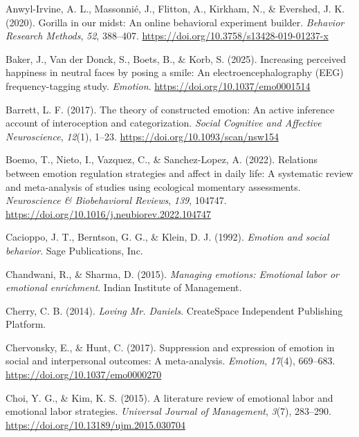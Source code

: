 \documentclass[
  letterpaper,
  DIV=11,
  numbers=noendperiod]{scrartcl}
\newlength{\cslhangindent}
\newenvironment{CSLReferences}[2] %
 {\begin{list}{}{%
  \setlength{\itemindent}{0pt}
  \setlength{\leftmargin}{0pt}
  \setlength{\parsep}{0pt}
  \ifodd #1
   \setlength{\leftmargin}{\cslhangindent}
   \setlength{\itemindent}{-1\cslhangindent}
  \fi
  \setlength{\itemsep}{#2\baselineskip}}}
 {\end{list}}
\begin{document}
\protect{}\label{refs}
\begin{CSLReferences}{1}{0}
Anwyl-Irvine, A. L., Massonnié, J., Flitton, A., Kirkham, N., \&
Evershed, J. K. (2020). Gorilla in our midst: An online behavioral
experiment builder. \emph{Behavior Research Methods}, \emph{52},
388--407. \url{https://doi.org/10.3758/s13428-019-01237-x}

Baker, J., Van der Donck, S., Boets, B., \& Korb, S. (2025). Increasing
perceived happiness in neutral faces by posing a smile: An
electroencephalography ({EEG}) frequency-tagging study. \emph{Emotion}.
\url{https://doi.org/10.1037/emo0001514}

Barrett, L. F. (2017). The theory of constructed emotion: An active
inference account of interoception and categorization. \emph{Social
Cognitive and Affective Neuroscience}, \emph{12}(1), 1--23.
\url{https://doi.org/10.1093/scan/nsw154}

Boemo, T., Nieto, I., Vazquez, C., \& Sanchez-Lopez, A. (2022).
Relations between emotion regulation strategies and affect in daily
life: A systematic review and meta-analysis of studies using ecological
momentary assessments. \emph{Neuroscience \& Biobehavioral Reviews},
\emph{139}, 104747.
\url{https://doi.org/10.1016/j.neubiorev.2022.104747}

Cacioppo, J. T., Berntson, G. G., \& Klein, D. J. (1992). \emph{Emotion
and social behavior}. Sage Publications, Inc.

Chandwani, R., \& Sharma, D. (2015). \emph{Managing emotions: Emotional
labor or emotional enrichment}. Indian Institute of Management.

Cherry, C. B. (2014). \emph{Loving {Mr. Daniels}}. CreateSpace
Independent Publishing Platform.

Chervonsky, E., \& Hunt, C. (2017). Suppression and expression of
emotion in social and interpersonal outcomes: A meta-analysis.
\emph{Emotion}, \emph{17}(4), 669--683.
\url{https://doi.org/10.1037/emo0000270}

Choi, Y. G., \& Kim, K. S. (2015). A literature review of emotional
labor and emotional labor strategies. \emph{Universal Journal of
Management}, \emph{3}(7), 283--290.
\url{https://doi.org/10.13189/ujm.2015.030704}


\end{CSLReferences}
\end{document}
